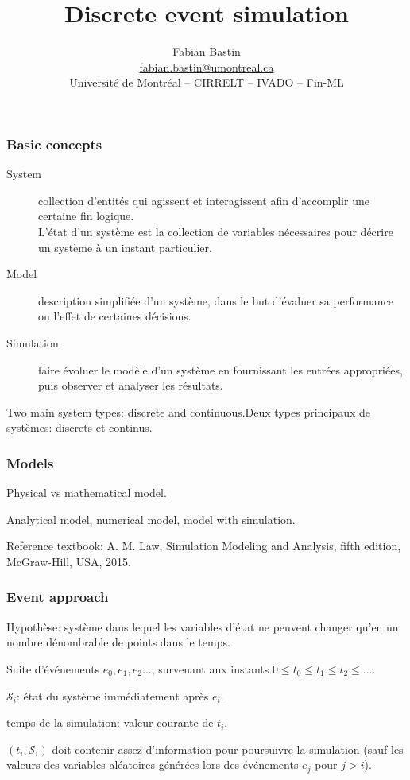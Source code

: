 \documentclass[t,usepdftitle=false]{beamer}
\title[Simulation]{Discrete event simulation}
\author[Fabian Bastin]{Fabian Bastin \\ \url{fabian.bastin@umontreal.ca} \\ Université de Montréal -- CIRRELT -- IVADO -- Fin-ML}
\date{}
\def\cS{\mathcal{S}}
\begin{document}
\frame{\titlepage}

\begin{frame}
	\frametitle{Basic concepts}
	
	\begin{description}
		\item[System]
		collection d'entités qui agissent et interagissent afin d'accomplir une certaine fin logique.\\
		L'état d'un système est la collection de variables nécessaires pour décrire un système à un instant particulier.
		\item[Model]
		description simplifiée d'un système, dans le but d'évaluer sa performance ou l'effet de certaines décisions.
		\item[Simulation]
		faire évoluer le modèle d'un système en fournissant les entrées appropriées, puis observer et analyser les résultats.
	\end{description}
	
	\mbox{}
	
	Two main system types: discrete and continuous.Deux types principaux de systèmes: discrets et continus.
	
\end{frame}

\begin{frame}
	\frametitle{Models}
	
	Physical vs mathematical model.
	
	\mbox{}
	
	Analytical model, numerical model, model with simulation.

\mbox{}

Reference textbook: 
A. M. Law, Simulation Modeling and Analysis, fifth edition, McGraw-Hill, USA, 2015.

\end{frame}

\begin{frame}
\frametitle{Event approach}

Hypothèse: système dans lequel les variables d'état ne peuvent changer qu'en un nombre dénombrable de points dans le temps.

\mbox{}

Suite d'événements $e_0, e_1, e_2\ldots$, survenant aux instants $0 \leq t_0 \leq t_1 \leq t_2 \leq \ldots$. 

\mbox{}

${\cS_i}$: état du système immédiatement après ${e_i}$.

\mbox{}

temps de la simulation: valeur courante de ${t_i}$.

\mbox{}

$(t_i,\cS_i)$ doit contenir assez d'information pour poursuivre la simulation (sauf les valeurs des variables aléatoires générées lors des événements $e_j$ pour $j > i$).

\end{frame}
\end{document}
